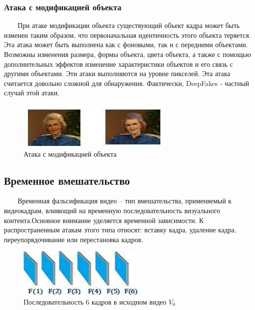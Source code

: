 \documentclass[12pt]{article}
\begin{document}
    \subsubsection{Атака с модификацией объекта}
        $\qquad$При атаке модификации объекта существующий объект кадра может быть изменен таким образом, что первоначальная идентичность этого объекта теряется. Эта атака может быть выполнена как с фоновыми, так и с передними объектами. Возможны изменения размера, формы объекта, цвета объекта, а также с помощью дополнительных эффектов изменение характеристики объектов и его связь с другими объектами. Эти атаки выполняются на уровне пикселей. Эта атака считается довольно сложной для обнаружения. Фактически,  DeepFakes - частный случай этой атаки.
        \newline
        \begin{figure}[h!]
            \centering
            \includegraphics[width = 200 pt] {7.jpg}
            \caption{Атака с модификацией объекта}
        \end{figure}
        \newline
    \subsection{Временное вмешательство}
        $\qquad$Временная фальсификация видео – тип вмешательства, применяемый к видеокадрам, влияющий на временную последовательность визуального контента.Основное внимание уделяется временной
        зависимости. К распространенным атакам этого типа относят: вставку кадра, удаление кадра, переупорядочивание или перестановка кадров.
        \newline
        \begin{figure}[h!]
            \centering
            \includegraphics[width = 180 pt] {8.jpg}
            \caption{Последовательность 6 кадров в исходном видео $V_0$}
        \end{figure}
        \newline
\end{document}
